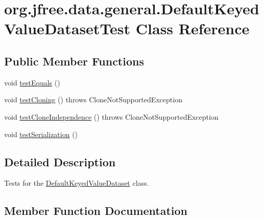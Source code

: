 \hypertarget{classorg_1_1jfree_1_1data_1_1general_1_1_default_keyed_value_dataset_test}{}\section{org.\+jfree.\+data.\+general.\+Default\+Keyed\+Value\+Dataset\+Test Class Reference}
\label{classorg_1_1jfree_1_1data_1_1general_1_1_default_keyed_value_dataset_test}
\subsection*{Public Member Functions}
\begin{DoxyCompactItemize}
\item 
void \mbox{\hyperlink{classorg_1_1jfree_1_1data_1_1general_1_1_default_keyed_value_dataset_test_aaf766aab0e6984590fb97e5fab7de74c}{test\+Equals}} ()
\item 
void \mbox{\hyperlink{classorg_1_1jfree_1_1data_1_1general_1_1_default_keyed_value_dataset_test_aadd0f63522fe2250669f1e9ac6e570ce}{test\+Cloning}} ()  throws Clone\+Not\+Supported\+Exception 
\item 
void \mbox{\hyperlink{classorg_1_1jfree_1_1data_1_1general_1_1_default_keyed_value_dataset_test_a664ca8f9199e6cef055a0f0ea40dd9e9}{test\+Clone\+Independence}} ()  throws Clone\+Not\+Supported\+Exception 
\item 
void \mbox{\hyperlink{classorg_1_1jfree_1_1data_1_1general_1_1_default_keyed_value_dataset_test_a304131996108454c3ae1ab7767dfa770}{test\+Serialization}} ()
\end{DoxyCompactItemize}


\subsection{Detailed Description}
Tests for the \mbox{\hyperlink{classorg_1_1jfree_1_1data_1_1general_1_1_default_keyed_value_dataset}{Default\+Keyed\+Value\+Dataset}} class. 

\subsection{Member Function Documentation}
\mbox{\label{classorg_1_1jfree_1_1data_1_1general_1_1_default_keyed_value_dataset_test_a664ca8f9199e6cef055a0f0ea40dd9e9}} 
